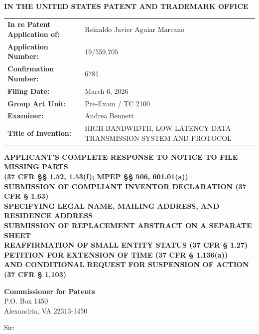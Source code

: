 \documentclass[11pt,letterpaper]{article}
\begin{document}
\thispagestyle{empty}

\begin{center}
    \large\textbf{IN THE UNITED STATES PATENT AND TRADEMARK OFFICE} \\
\end{center}

\vspace{0.3cm}
\noindent\begin{tabular}{p{2.3in}p{4.0in}}
\textbf{In re Patent Application of:} & Reinaldo Javier Aguiar Marcano \\
\textbf{Application Number:} & 19/559,705 \\
\textbf{Confirmation Number:} & 6781 \\
\textbf{Filing Date:} & March 6, 2026 \\
\textbf{Group Art Unit:} & Pre-Exam / TC 2100 \\
\textbf{Examiner:} & Andrea Bennett \\
\textbf{Title of Invention:} & HIGH-BANDWIDTH, LOW-LATENCY DATA TRANSMISSION SYSTEM AND PROTOCOL \\
\end{tabular}

\vspace{0.8cm}
\begin{center}
    \textbf{\large APPLICANT'S COMPLETE RESPONSE TO NOTICE TO FILE MISSING PARTS \\
    (37 CFR \S\S{} 1.52, 1.53(f); MPEP \S\S{} 506, 601.01(a)) \\
    SUBMISSION OF COMPLIANT INVENTOR DECLARATION (37 CFR \S{} 1.63) \\
    SPECIFYING LEGAL NAME, MAILING ADDRESS, AND RESIDENCE ADDRESS \\
    SUBMISSION OF REPLACEMENT ABSTRACT ON A SEPARATE SHEET \\
    REAFFIRMATION OF SMALL ENTITY STATUS (37 CFR \S{} 1.27) \\
    PETITION FOR EXTENSION OF TIME (37 CFR \S{} 1.136(a)) \\
    AND CONDITIONAL REQUEST FOR SUSPENSION OF ACTION (37 CFR \S{} 1.103)}
\end{center}

\vspace{0.3cm}
\noindent\textbf{Commissioner for Patents} \\
\noindent P.O. Box 1450 \\
\noindent Alexandria, VA 22313-1450

\vspace{0.3cm}
\noindent Sir:
\end{document}
